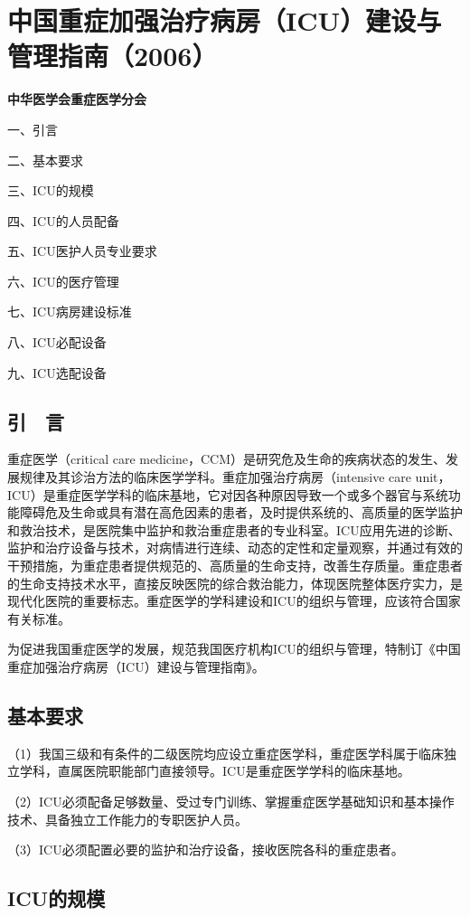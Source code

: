 \chapter{中国重症加强治疗病房（ICU）建设与管理指南（2006）}

\textbf{中华医学会重症医学分会}

一、引言

二、基本要求

三、ICU的规模

四、ICU的人员配备

五、ICU医护人员专业要求

六、ICU的医疗管理

七、ICU病房建设标准

八、ICU必配设备

九、ICU选配设备

\section{引　言}

重症医学（critical care
medicine，CCM）是研究危及生命的疾病状态的发生、发展规律及其诊治方法的临床医学学科。重症加强治疗病房（intensive
care
unit，ICU）是重症医学学科的临床基地，它对因各种原因导致一个或多个器官与系统功能障碍危及生命或具有潜在高危因素的患者，及时提供系统的、高质量的医学监护和救治技术，是医院集中监护和救治重症患者的专业科室。ICU应用先进的诊断、监护和治疗设备与技术，对病情进行连续、动态的定性和定量观察，并通过有效的干预措施，为重症患者提供规范的、高质量的生命支持，改善生存质量。重症患者的生命支持技术水平，直接反映医院的综合救治能力，体现医院整体医疗实力，是现代化医院的重要标志。重症医学的学科建设和ICU的组织与管理，应该符合国家有关标准。

为促进我国重症医学的发展，规范我国医疗机构ICU的组织与管理，特制订《中国重症加强治疗病房（ICU）建设与管理指南》。

\section{基本要求}

（1）我国三级和有条件的二级医院均应设立重症医学科，重症医学科属于临床独立学科，直属医院职能部门直接领导。ICU是重症医学学科的临床基地。

（2）ICU必须配备足够数量、受过专门训练、掌握重症医学基础知识和基本操作技术、具备独立工作能力的专职医护人员。

（3）ICU必须配置必要的监护和治疗设备，接收医院各科的重症患者。

\section{ICU的规模}

